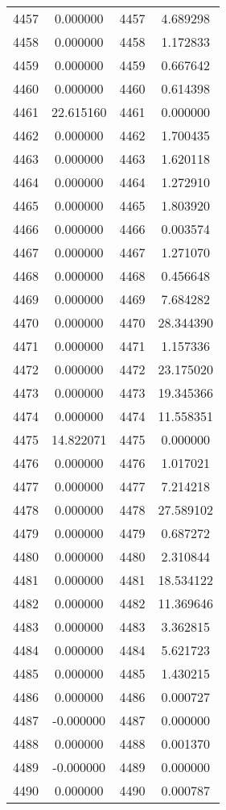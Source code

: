 \documentclass[12pt]{article}
\begin{document}
\begin{longtable}{@{}cccc@{}}
4457 & 0.000000 & 4457 & 4.689298 \\
4458 & 0.000000 & 4458 & 1.172833 \\
4459 & 0.000000 & 4459 & 0.667642 \\
4460 & 0.000000 & 4460 & 0.614398 \\
4461 & 22.615160 & 4461 & 0.000000 \\
4462 & 0.000000 & 4462 & 1.700435 \\
4463 & 0.000000 & 4463 & 1.620118 \\
4464 & 0.000000 & 4464 & 1.272910 \\
4465 & 0.000000 & 4465 & 1.803920 \\
4466 & 0.000000 & 4466 & 0.003574 \\
4467 & 0.000000 & 4467 & 1.271070 \\
4468 & 0.000000 & 4468 & 0.456648 \\
4469 & 0.000000 & 4469 & 7.684282 \\
4470 & 0.000000 & 4470 & 28.344390 \\
4471 & 0.000000 & 4471 & 1.157336 \\
4472 & 0.000000 & 4472 & 23.175020 \\
4473 & 0.000000 & 4473 & 19.345366 \\
4474 & 0.000000 & 4474 & 11.558351 \\
4475 & 14.822071 & 4475 & 0.000000 \\
4476 & 0.000000 & 4476 & 1.017021 \\
4477 & 0.000000 & 4477 & 7.214218 \\
4478 & 0.000000 & 4478 & 27.589102 \\
4479 & 0.000000 & 4479 & 0.687272 \\
4480 & 0.000000 & 4480 & 2.310844 \\
4481 & 0.000000 & 4481 & 18.534122 \\
4482 & 0.000000 & 4482 & 11.369646 \\
4483 & 0.000000 & 4483 & 3.362815 \\
4484 & 0.000000 & 4484 & 5.621723 \\
4485 & 0.000000 & 4485 & 1.430215 \\
4486 & 0.000000 & 4486 & 0.000727 \\
4487 & -0.000000 & 4487 & 0.000000 \\
4488 & 0.000000 & 4488 & 0.001370 \\
4489 & -0.000000 & 4489 & 0.000000 \\
4490 & 0.000000 & 4490 & 0.000787 \\

\end{longtable}
\end{document}
